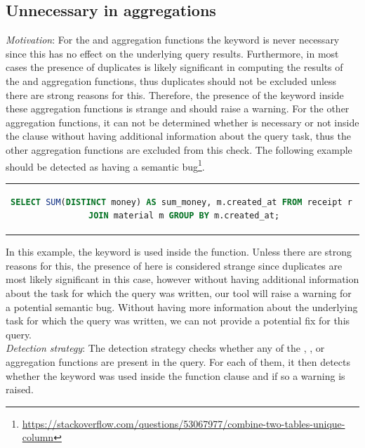 \subsection{Unnecessary  in aggregations}
\emph{Motivation}: For the  and  aggregation functions the  keyword is never necessary since this has no effect on the underlying query results. Furthermore, in most cases the presence of duplicates is likely significant in computing the results of the  and  aggregation functions, thus duplicates should not be excluded unless there are strong reasons for this. Therefore, the presence of the  keyword inside these aggregation functions is strange and should raise a warning. For the other aggregation functions, it can not be determined whether  is necessary or not inside the clause without having additional information about the query task, thus the other aggregation functions are excluded from this check. The following example should be detected as having a semantic bug\footnote{\url{https://stackoverflow.com/questions/53067977/combine-two-tables-unique-column}}.

\begin{center}
\begin{tabular}{c}
\begin{lstlisting}[language=SQL]
SELECT SUM(DISTINCT money) AS sum_money, m.created_at FROM receipt r 
JOIN material m GROUP BY m.created_at;
\end{lstlisting}
\end{tabular}
\end{center}

In this example, the  keyword is used inside the  function. Unless there are strong reasons for this, the presence of  here is considered strange since duplicates are most likely significant in this case, however without having additional information about the task for which the query was written, our tool will raise a warning for a potential semantic bug. Without having more information about the underlying task for which the query was written, we can not provide a potential fix for this query.\\

\noindent \emph{Detection strategy}: The detection strategy checks whether any of the , ,  or  aggregation functions are present in the query. For each of them, it then detects whether the  keyword was used inside the function clause and if so a warning is raised.

